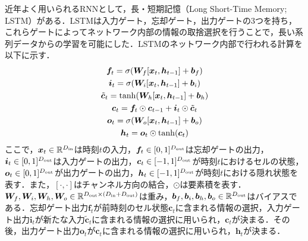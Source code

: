 \documentclass[12pt]{jarticle}
\numberwithin{equation}{section}    %
\numberwithin{figure}{section}      %
\numberwithin{table}{section}      %
\begin{document}
近年よく用いられるRNNとして，長・短期記憶（Long Short-Time Memory; LSTM）\cite{hochreiter1997long}がある．LSTMは入力ゲート，忘却ゲート，出力ゲートの3つを持ち，これらゲートによってネットワーク内部の情報の取捨選択を行うことで，長い系列データからの学習を可能にした．LSTMのネットワーク内部で行われる計算を以下に示す．
\begin{gather}
    \bm{f}_{t} = \sigma(\bm{W}_{f}[\bm{x}_{t}, \bm{h}_{t-1}] + \bm{b}_{f}) \\
    \bm{i}_{t} = \sigma(\bm{W}_{i}[\bm{x}_{t}, \bm{h}_{t-1}] + \bm{b}_{i}) \\
    \tilde{\bm{c}}_{t} = \tanh (\bm{W}_{h}[\bm{x}_{t}, \bm{h}_{t-1}] + \bm{b}_{h}) \\
    \bm{c}_{t} = \bm{f}_{t} \odot \bm{c}_{t-1} + \bm{i}_{t} \odot \tilde{\bm{c}}_{t} \\
    \bm{o}_{t} = \sigma(\bm{W}_{o}[\bm{x}_{t}, \bm{h}_{t-1}] + \bm{b}_{o}) \\
    \bm{h}_{t} = \bm{o}_{t} \odot \tanh(\bm{c}_{t})
\end{gather}
ここで，$\bm{x}_{t} \in \mathbb{R}^{D_{\text{in}}}$は時刻$t$の入力，$\bm{f}_{t} \in [0, 1]^{D_{\text{out}}}$は忘却ゲートの出力，$\bm{i}_{t} \in [0, 1]^{D_{\text{out}}}$は入力ゲートの出力，$\bm{c}_{t} \in [-1, 1]^{D_{\text{out}}}$が時刻$t$におけるセルの状態，$\bm{o}_{t} \in [0, 1]^{D_{\text{out}}}$が出力ゲートの出力，$\bm{h}_{t} \in [-1, 1]^{D_{\text{out}}}$が時刻$t$における隠れ状態を表す．また，$[\cdot, \cdot]$はチャンネル方向の結合，$\odot$は要素積を表す．$\bm{W}_{f}, \bm{W}_{i}, \bm{W}_{h}, \bm{W}_{o} \in \mathbb{R}^{D_{\text{out}} \times (D_{\text{in}} + D_{\text{out}})}$は重み，$\bm{b}_{f}, \bm{b}_{i}, \bm{b}_{h}, \bm{b}_{o} \in \mathbb{R}^{D_{\text{out}}}$はバイアスである．忘却ゲート出力$\bm{f}_{t}$が前時刻のセル状態$\bm{c}_{t}$に含まれる情報の選択，入力ゲート出力$\bm{i}_{t}$が新たな入力$\tilde{\bm{c}}_{t}$に含まれる情報の選択に用いられ，$\bm{c}_{t}$が決まる．その後，出力ゲート出力$\bm{o}_{t}$が$\bm{c}_{t}$に含まれる情報の選択に用いられ，$\bm{h}_{t}$が決まる．
\end{document}

